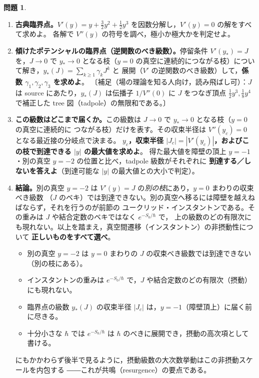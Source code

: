 \documentclass[dvipdfmx, uplatex]{jsarticle}
\newcommand{\hb}{\hbar}
\theoremstyle{definition}
\newtheorem{prob}{問題}
\begin{document}
\begin{prob}\label{prob:tadpole}
\begin{enumerate}
\item \textbf{古典臨界点。}$V'(y)=y+\tfrac32y^2+\tfrac12y^3$ を因数分解し，$V'(y)=0$ の解をすべて求めよ。
各解で $V''(y)$ の符号を調べ，極小か極大かを判定せよ。
\item \textbf{傾けたポテンシャルの臨界点（逆関数のべき級数）。}停留条件 $V'(y_*)=J$ を，$J\to0$ で
$y_*\to0$ となる枝（$y=0$ の真空に連続的につながる枝）について解き，$y_*(J)=\sum_{k\ge1}\gamma_k J^k$ と
展開（$V'$ の逆関数のべき級数）して，\textbf{係数 $\gamma_1,\gamma_2,\gamma_3$ を求めよ}。
〔補足（場の理論を知る人向け，読み飛ばし可）：$J$ は source にあたり，$y_*(J)$ は伝播子 $1/V''(0)$ に
$J$ をつなぎ頂点 $\tfrac12y^3,\tfrac18y^4$ で補正した tree 図（tadpole）の無限和である。〕
\item \textbf{この級数はどこまで届くか。}この級数は $J\to0$ で $y_*\to0$ となる枝（$y=0$ の真空に連続的に
つながる枝）だけを表す。その収束半径は $V''(y_c)=0$ となる最近接の分岐点で決まる。
\textbf{$y_c$，収束半径 $|J_c|=|V'(y_c)|$，およびこの枝で到達できる $|y|$ の最大値を求めよ}。
得た最大値を障壁の頂上 $y=-1$・別の真空 $y=-2$ の位置と比べ，tadpole 級数がそれぞれに
\textbf{到達する／しないを答えよ}（到達可能な $|y|$ の最大値との大小で判定）。
\item \textbf{結論。}別の真空 $y=-2$ は $V'(y)=J$ の\emph{別の枝}にあり，$y=0$ まわりの収束べき級数
（$J$ のベキ）では到達できない。別の真空へ移るには障壁を越えねばならず，それを行うのが前節の
ユークリッド・インスタントンである。その重みは $J$ や結合定数のベキではなく $e^{-S_0/\hb}$ で，
上の級数のどの有限次にも現れない。以上を踏まえ，真空間遷移（インスタントン）の非摂動性について
\textbf{正しいものをすべて選べ}。
\begin{itemize}\setlength{\itemsep}{1pt}
\item[(あ)] 別の真空 $y=-2$ は $y=0$ まわりの $J$ の収束べき級数では到達できない（別の枝にある）。
\item[(い)] インスタントンの重みは $e^{-S_0/\hb}$ で，$J$ や結合定数のどの有限次（摂動）にも現れない。
\item[(う)] 臨界点の級数 $y_*(J)$ の収束半径 $|J_c|$ は，$y=-1$（障壁頂上）に届く前に尽きる。
\item[(え)] 十分小さな $\hb$ では $e^{-S_0/\hb}$ は $\hb$ のべきに展開でき，摂動の高次項として書ける。
\end{itemize}
にもかかわらず後半で見るように，摂動級数の大次数挙動はこの非摂動スケールを内包する
――これが共鳴（resurgence）の要点である。
\end{enumerate}
\end{prob}
\end{document}
